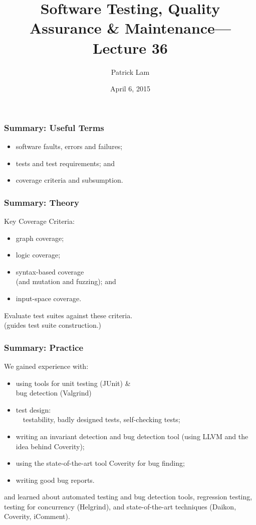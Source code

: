 \documentclass{beamer}
\title{Software Testing, Quality Assurance \& Maintenance---Lecture 36}
\author{Patrick Lam}
\date{April 6, 2015}
\newenvironment{changemargin}[1]{%
  \begin{list}{}{%
    \setlength{\topsep}{0pt}%
    \setlength{\leftmargin}{#1}%
    \setlength{\rightmargin}{1em}
    \setlength{\listparindent}{\parindent}%
    \setlength{\itemindent}{\parindent}%
    \setlength{\parsep}{\parskip}%
  }%
  \item[]}{\end{list}}
\begin{document}
\begin{frame}
  \titlepage
\end{frame}

\begin{frame}
  \frametitle{Summary: Useful Terms}
  \Large
  \begin{changemargin}{1cm}
\begin{itemize}
\item software faults, errors and failures; 
\item tests and test requirements; and
\item coverage criteria and subsumption.
\end{itemize}
  \end{changemargin}
\end{frame}

\begin{frame}
  \frametitle{Summary: Theory}
  \Large
  \begin{changemargin}{1.5cm}
Key Coverage Criteria:
\begin{itemize}
\item graph coverage;
\item logic coverage;
\item syntax-based coverage \\ \hspace*{1cm} (and mutation and fuzzing); and 
\item input-space coverage.
\end{itemize}
Evaluate test suites against these criteria.\\
\hspace*{1cm}(guides test suite construction.)
  \end{changemargin}
\end{frame}

\begin{frame}
  \frametitle{Summary: Practice}
  \begin{changemargin}{1.8cm}
We gained experience with:
\begin{itemize}
\item using tools for unit testing (JUnit) \& \\ \hspace*{1cm} bug detection (Valgrind) 
\item  test design: \\ ~~testability, badly designed tests, self-checking tests;
\item writing an invariant detection and bug detection tool (using
LLVM and the idea behind Coverity);\\
\item using the state-of-the-art tool Coverity for bug finding;
\item writing good bug reports.
\end{itemize}
and learned about automated testing and bug detection tools,
regression testing, testing for concurrency (Helgrind), and
state-of-the-art techniques (Daikon, Coverity, iComment).
  \end{changemargin}
\end{frame}
\end{document}

